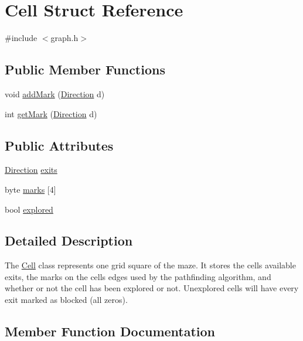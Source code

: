 \hypertarget{structCell}{}\section{Cell Struct Reference}
\label{structCell}


{\ttfamily \#include $<$graph.\+h$>$}

\subsection*{Public Member Functions}
\begin{DoxyCompactItemize}
\item 
void \hyperlink{structCell_a80aa84cf92ba1b06db0df55f3afbbad3}{add\+Mark} (\hyperlink{util_8h_a92e22a126ad6bf9d255b517e70d083f6}{Direction} d)
\item 
int \hyperlink{structCell_abb4a89d3e0182cf87a3091e0b15d99de}{get\+Mark} (\hyperlink{util_8h_a92e22a126ad6bf9d255b517e70d083f6}{Direction} d)
\end{DoxyCompactItemize}
\subsection*{Public Attributes}
\begin{DoxyCompactItemize}
\item 
\hyperlink{util_8h_a92e22a126ad6bf9d255b517e70d083f6}{Direction} \hyperlink{structCell_a91285699009e9fb89724dc7302d7e9e0}{exits}
\item 
byte \hyperlink{structCell_aba96fc4db8247038613b0bc8be936db9}{marks} \mbox{[}4\mbox{]}
\item 
bool \hyperlink{structCell_aa3a41503f8935cdb70adfb2d35fa7923}{explored}
\end{DoxyCompactItemize}


\subsection{Detailed Description}
The \hyperlink{structCell}{Cell} class represents one grid square of the maze. It stores the cell\textquotesingle{}s available exits, the marks on the cell\textquotesingle{}s edges used by the pathfinding algorithm, and whether or not the cell has been explored or not. Unexplored cells will have every exit marked as blocked (all zeros). 

\subsection{Member Function Documentation}
\mbox{\label{structCell_a80aa84cf92ba1b06db0df55f3afbbad3}} 
